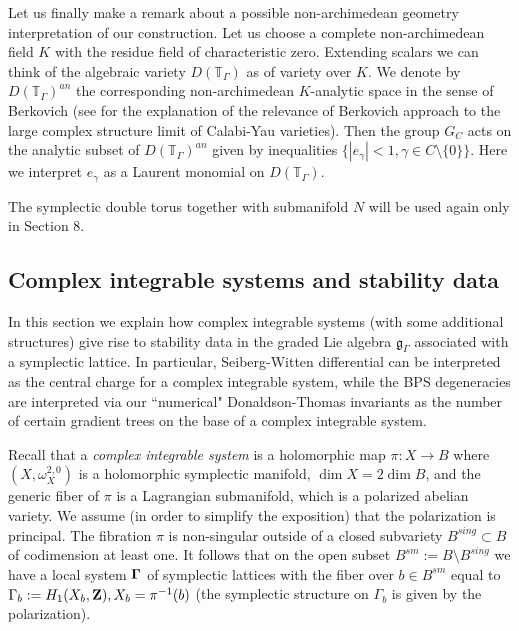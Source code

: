 \documentclass[12pt]{article}
\begin{document}
Let us finally make a remark about a possible non-archimedean geometry interpretation of our construction.
Let us choose a complete non-archimedean field $K$ with the residue field of characteristic zero. Extending scalars we can think of the algebraic variety $D({\mathbb T}_{\Gamma})$ as of variety over $K$. We denote by
$D({\mathbb T}_{\Gamma})^{an}$ the corresponding non-archimedean $K$-analytic space in the sense of Berkovich (see \cite{KoSo1} for the explanation of the relevance of Berkovich approach to the large complex structure limit of Calabi-Yau varieties). Then the group $G_C$ acts on the analytic subset of $D({\mathbb T}_{\Gamma})^{an}$ given by inequalities $\{|e_{\gamma}|<1, \gamma\in C\setminus \{0\}\}$. Here we interpret
$e_{\gamma}$ as a Laurent monomial on $D({\mathbb T}_{\Gamma})$.

The symplectic double torus together with submanifold $N$ will be used again only in Section 8.





\subsection{Complex integrable systems and stability data}

In this section we explain how complex integrable systems (with some additional structures)
give rise to stability data in the graded Lie algebra $\mathfrak{g}_\Gamma$ associated with a symplectic lattice. In particular, Seiberg-Witten differential can be interpreted as the central charge
for a complex integrable system, while the BPS degeneracies are interpreted via our ``numerical" Donaldson-Thomas invariants as the number of certain gradient trees on the base of a complex integrable system.


Recall that a {\it complex integrable system} is a holomorphic map $\pi:X\to B$ where $(X,\omega^{2,0}_X)$ is a holomorphic symplectic manifold, $\dim X=2\dim B$,  and the generic fiber of $\pi$ is a Lagrangian submanifold, which is a polarized abelian variety. We assume (in order to simplify the exposition) that the polarization is
 principal. The fibration $\pi$ is non-singular outside of a closed subvariety $B^{sing}\subset B$ of codimension at least one.
It follows that on the open subset $B^{sm}:=B\setminus B^{sing}$ we have a local system ${\bf \Gamma}$ of symplectic lattices with the fiber over $b\in B^{sm}$ equal to $\Gamma_b:=H_1(X_b,{\bf Z}), X_b=\pi^{-1}(b)$ (the symplectic structure on $\Gamma_b$ is given by the  polarization).
\end{document}
